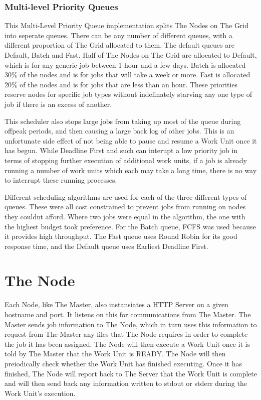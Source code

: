 \subsubsection{Multi-level Priority Queues}
This Multi-Level Priority Queue implementation splits The Nodes on The Grid into seperate queues. There can be any number of different queues, with a different proportion of The Grid allocated to them. The default queues are Default, Batch and Fast. Half of The Nodes on The Grid are allocated to Default, which is for any generic job between 1 hour and a few days. Batch is allocated 30\% of the nodes and is for jobs that will take a week or more. Fast is allocated 20\% of the nodes and is for jobs that are less than an hour. These priorities reserve nodes for specific job types without indefinately starving any one type of job if there is an excess of another.

This scheduler also stops large jobs from taking up most of the queue during offpeak periods, and then causing a large back log of other jobs. This is an unfortunate side effect of not being able to pause and resume a Work Unit once it has begun. While Deadline First and such can interupt a low priority job in terms of stopping further execution of additional work units, if a job is already running a number of work units which each may take a long time, there is no way to interrupt these running processes.

Different scheduling algorithms are used for each of the three different types of queues. These were all cost constrained to prevent jobs from running on nodes they couldnt afford. Where two jobs were equal in the algorithm, the one with the highest budget took preference. For the Batch queue, FCFS was used because it provides high throughput. The Fast queue uses Round Robin for its good response time, and the Default queue uses Earliest Deadline First.

\section{The Node}
Each Node, like The Master, also instansiates a HTTP Server on a given hostname and port. It listens on this for communications from The Master. The Master sends job information to The Node, which in turn uses this information to request from The Master any files that The Node requires in order to complete the job it has been assigned. The Node will then execute a Work Unit once it is told by The Master that the Work Unit is READY. The Node will then preiodically check whether the Work Unit has finished executing. Once it has finished, The Node will report back to The Server that the Work Unit is complete and will then send back any information written to stdout or stderr during the Work Unit's execution.

